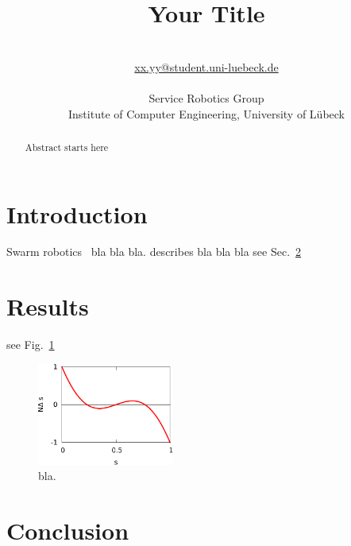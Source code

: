 \documentclass[a4paper]{article}
\title{Your Title}\let\Title\@title
\author{\AuthorName\\
  \href{mailto:xx.yy@student.uni-luebeck.de}{xx.yy@student.uni-luebeck.de}\\
  \small \seminar\\
  \small Service Robotics Group\\
  \small Institute of Computer Engineering, University of L\"ubeck\\
}\let\Author\@author
\begin{document}
\maketitle

\begin{abstract}
  \noindent%
  Abstract starts here
\end{abstract}


\section{Introduction}

Swarm robotics~\citep{brambilla13} bla bla bla.
\citet{hamann18} describes bla bla bla
see Sec.~\ref{sec:results}


\section{Results}
\label{sec:results}

see Fig.~\ref{fig:image}

\begin{figure}[t]
  \centering
  \includegraphics[angle=0,width=0.4\textwidth]{./figs/swarmDelta}
  \caption{\label{fig:image}bla.}
\end{figure}



\section{Conclusion}


\footnotesize


\end{document}
